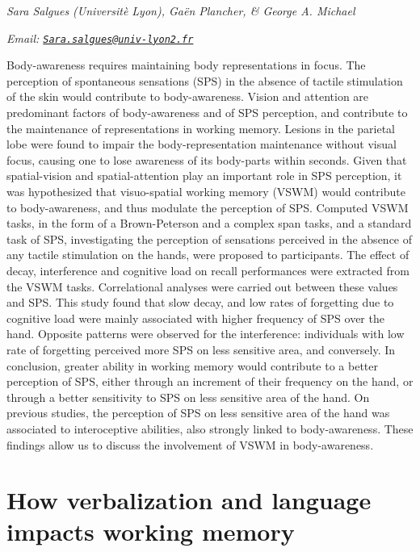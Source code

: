 \documentclass[
  12pt,
]{book}
\begin{document}
\emph{Sara Salgues (Universitè Lyon), Gaën Plancher, \& George A. Michael}

\emph{Email: \href{mailto:Sara.salgues@univ-lyon2.fr}{\nolinkurl{Sara.salgues@univ-lyon2.fr}}}

Body-awareness requires maintaining body representations in focus. The perception of spontaneous sensations (SPS) in the absence of tactile stimulation of the skin would contribute to body-awareness. Vision and attention are predominant factors of body-awareness and of SPS perception, and contribute to the maintenance of representations in working memory. Lesions in the parietal lobe were found to impair the body-representation maintenance without visual focus, causing one to lose awareness of its body-parts within seconds. Given that spatial-vision and spatial-attention play an important role in SPS perception, it was hypothesized that visuo-spatial working memory (VSWM) would contribute to body-awareness, and thus modulate the perception of SPS. Computed VSWM tasks, in the form of a Brown-Peterson and a complex span tasks, and a standard task of SPS, investigating the perception of sensations perceived in the absence of any tactile stimulation on the hands, were proposed to participants. The effect of decay, interference and cognitive load on recall performances were extracted from the VSWM tasks. Correlational analyses were carried out between these values and SPS. This study found that slow decay, and low rates of forgetting due to cognitive load were mainly associated with higher frequency of SPS over the hand. Opposite patterns were observed for the interference: individuals with low rate of forgetting perceived more SPS on less sensitive area, and conversely. In conclusion, greater ability in working memory would contribute to a better perception of SPS, either through an increment of their frequency on the hand, or through a better sensitivity to SPS on less sensitive area of the hand. On previous studies, the perception of SPS on less sensitive area of the hand was associated to interoceptive abilities, also strongly linked to body-awareness. These findings allow us to discuss the involvement of VSWM in body-awareness.

\hypertarget{how-verbalization-and-language-impacts-working-memory}{%
\chapter{How verbalization and language impacts working memory}\label{how-verbalization-and-language-impacts-working-memory}}
\end{document}
